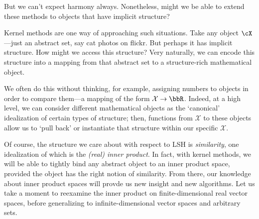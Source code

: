 \documentclass[twoside,11pt]{homework}
\begin{document}
\begin{multicols}{2}
But we can't expect harmony always. Nonetheless, might we be able to extend these
methods to objects that have implicit structure?

Kernel methods are one way of approaching such situations. Take any object $\cX$---just
an abstract set, say cat photos on flickr. But perhaps it has implicit
structure. How might we access this structure? Very naturally, we can encode
this structure into a mapping from that abstract set to a structure-rich
mathematical object.

We often do this without thinking, for example, assigning numbers to objects
in order to compare them---a mapping of the form $\mathcal{X} \to \bbR$. Indeed,
at a high level, we can consider different mathematical objects as the `canonical'
idealization of certain types of structure; then, functions from $\mathcal{X}$ to
these objects allow us to `pull back' or instantiate that structure within our
specific $\mathcal{X}$.

Of course, the structure we care about with respect to LSH is \emph{similarity},
one idealization of which is the \emph{(real) inner product}. In fact, with kernel
methods, we will be able to tightly bind any abstract object to an inner product
space, provided the object has the right notion of similarity. From there, our
knowledge about inner product spaces will provde us new insight and new algorithms.
Let us take a moment to reexamine the inner product on finite-dimensional real
vector spaces, before generalizing to infinite-dimensional vector spaces and
arbitrary sets.


\end{multicols}
\end{document}
